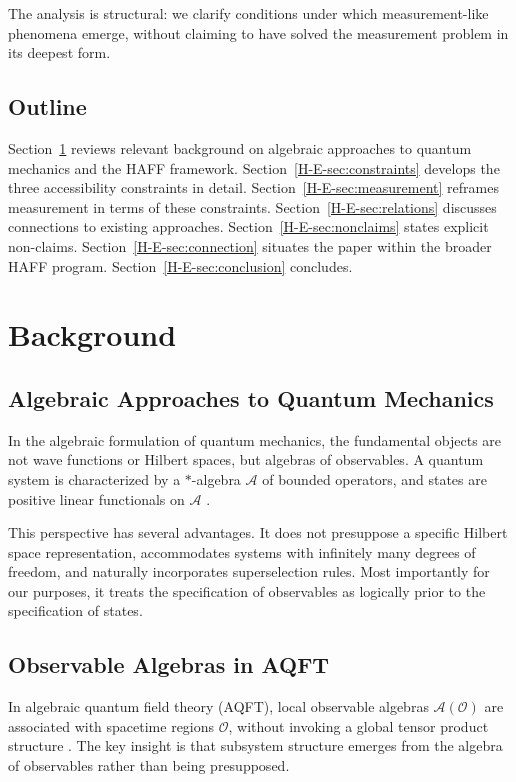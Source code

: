 \documentclass[12pt,a4paper,openany]{book}
\begin{document}
The analysis is structural: we clarify conditions under which measurement-like phenomena emerge, without claiming to have solved the measurement problem in its deepest form.

\subsection{Outline}

Section~\ref{H-E-sec:background} reviews relevant background on algebraic approaches to quantum mechanics and the HAFF framework. Section~\ref{H-E-sec:constraints} develops the three accessibility constraints in detail. Section~\ref{H-E-sec:measurement} reframes measurement in terms of these constraints. Section~\ref{H-E-sec:relations} discusses connections to existing approaches. Section~\ref{H-E-sec:nonclaims} states explicit non-claims. Section~\ref{H-E-sec:connection} situates the paper within the broader HAFF program. Section~\ref{H-E-sec:conclusion} concludes.

\section{Background}
\label{H-E-sec:background}

\subsection{Algebraic Approaches to Quantum Mechanics}

In the algebraic formulation of quantum mechanics, the fundamental objects are not wave functions or Hilbert spaces, but algebras of observables. A quantum system is characterized by a $*$-algebra $\mathcal{A}$ of bounded operators, and states are positive linear functionals on $\mathcal{A}$ \cite{Haag1996,Araki1999}.

This perspective has several advantages. It does not presuppose a specific Hilbert space representation, accommodates systems with infinitely many degrees of freedom, and naturally incorporates superselection rules. Most importantly for our purposes, it treats the specification of observables as logically prior to the specification of states.

\subsection{Observable Algebras in AQFT}

In algebraic quantum field theory (AQFT), local observable algebras $\mathcal{A}(\mathcal{O})$ are associated with spacetime regions $\mathcal{O}$, without invoking a global tensor product structure \cite{Haag1996}. The key insight is that subsystem structure emerges from the algebra of observables rather than being presupposed.
\end{document}
